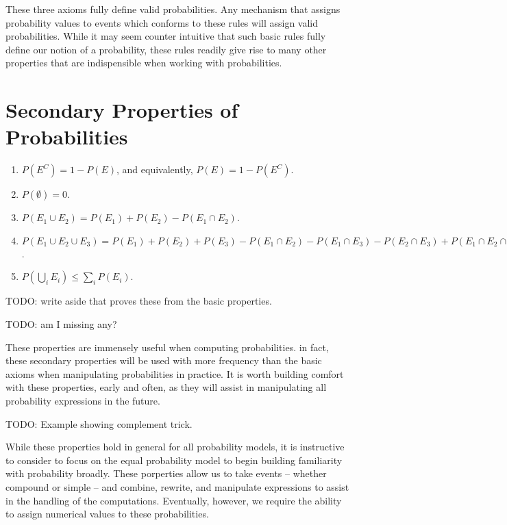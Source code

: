 \documentclass[
  letterpaper,
  DIV=11,
  numbers=noendperiod]{scrreprt}
\providecommand{\tightlist}{%
  \setlength{\itemsep}{0pt}\setlength{\parskip}{0pt}}\usepackage{longtable,booktabs,array}
\begin{document}
These three axioms fully define valid probabilities. Any mechanism that
assigns probability values to events which conforms to these rules will
assign valid probabilities. While it may seem counter intuitive that
such basic rules fully define our notion of a probability, these rules
readily give rise to many other properties that are indispensible when
working with probabilities.

\section{Secondary Properties of
Probabilities}\label{secondary-properties-of-probabilities}

\begin{enumerate}
\def\labelenumi{\arabic{enumi}.}
\tightlist
\item
  \(P(E^C) = 1-P(E)\), and equivalently, \(P(E) = 1 - P(E^C)\).
\item
  \(P(\emptyset) = 0\).
\item
  \(P(E_1 \cup E_2) = P(E_1) + P(E_2) - P(E_1\cap E_2)\).
\item
  \(P(E_1 \cup E_2 \cup E_3) = P(E_1) + P(E_2) + P(E_3) - P(E_1\cap E_2) - P(E_1 \cap E_3) - P(E_2 \cap E_3) + P(E_1 \cap E_2 \cap E_3)\).
\item
  \(P(\bigcup_i E_i) \leq \sum_i P(E_i)\).
\end{enumerate}

TODO: write aside that proves these from the basic properties.

TODO: am I missing any?

These properties are immensely useful when computing probabilities. in
fact, these secondary properties will be used with more frequency than
the basic axioms when manipulating probabilities in practice. It is
worth building comfort with these properties, early and often, as they
will assist in manipulating all probability expressions in the future.

TODO: Example showing complement trick.

While these properties hold in general for all probability models, it is
instructive to consider to focus on the equal probability model to begin
building familiarity with probability broadly. These porperties allow us
to take events -- whether compound or simple -- and combine, rewrite,
and manipulate expressions to assist in the handling of the
computations. Eventually, however, we require the ability to assign
numerical values to these probabilities.
\end{document}
